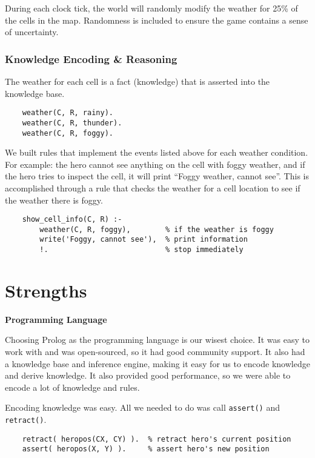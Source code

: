 \documentclass[10pt]{article}
\begin{document}
During each clock tick, the world will randomly modify the weather for 25\% of the cells in the map. Randomness is included to ensure the game contains a sense of uncertainty.

\subsubsection*{Knowledge Encoding \& Reasoning}

The weather for each cell is a fact (knowledge) that is asserted into the knowledge base.

\begin{verbatim}
    weather(C, R, rainy).
    weather(C, R, thunder).
    weather(C, R, foggy).
\end{verbatim}

We built rules that implement the events listed above for each weather condition. For example: the hero cannot see anything on the cell with foggy weather, and if the hero tries to inspect the cell, it will print “Foggy weather, cannot see”. This is accomplished through a rule that checks the weather for a cell location to see if the weather there is foggy.

\begin{verbatim}
    show_cell_info(C, R) :-
        weather(C, R, foggy),        % if the weather is foggy
        write('Foggy, cannot see'),  % print information
        !.                           % stop immediately
\end{verbatim}




\section{Strengths}

\textbf{Programming Language}

Choosing Prolog \cite{swiprolog} as the programming language is our wisest choice. It was easy to work with and was open-sourced, so it had good community support. It also had a knowledge base and inference engine, making it easy for us to encode knowledge and derive knowledge. It also provided good performance, so we were able to encode a lot of knowledge and rules.

Encoding knowledge was easy. All we needed to do was call \texttt{assert()} and \texttt{retract()}.

\begin{verbatim}
    retract( heropos(CX, CY) ).  % retract hero's current position
    assert( heropos(X, Y) ).     % assert hero's new position
\end{verbatim}
\end{document}
